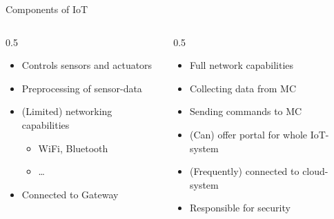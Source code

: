 \begin{frame}{Components of IoT}
\begin{columns}
\begin{column}[T]{0.5\textwidth}
      \begin{description}[Microcontroller]
        \item[Microcontroller]
        \begin{itemize}
          \item Controls sensors and actuators
          \item Preprocessing of sensor-data
          \item (Limited) networking capabilities
          \begin{itemize}
            \item WiFi, Bluetooth
            \item \ldots
          \end{itemize}
          \item Connected to Gateway
        \end{itemize}
      \end{description}
    \end{column}
    \begin{column}[T]{0.5\textwidth}
      \begin{description}[Actuators]
        \item[Gateway]
        \begin{itemize}
          \item Full network capabilities
          \item Collecting data from MC
          \item Sending commands to MC
          \item (Can) offer portal for whole IoT-system
          \item (Frequently) connected to cloud-system
          \item Responsible for security
        \end{itemize}
      \end{description}
    \end{column}
  \end{columns}
\end{frame}
